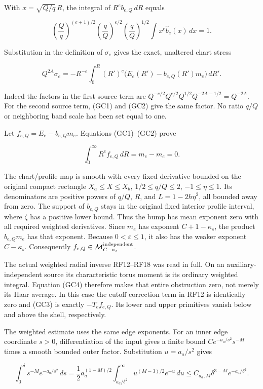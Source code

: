 \documentclass[10pt,a4paper]{article}
\begin{document}
With \(x=\sqrt{Q/q}\,R\), the integral of \(R^eb_{e,Q}\,dR\) equals

\[
\left(\frac Qq\right)^{(e+1)/2}
\left(\frac qQ\right)^{e/2}
\left(\frac qQ\right)^{1/2}
\int x^e\widehat b_e(x)\,dx=1.
\]

Substitution in the definition of \(\sigma_e\) gives the exact, unaltered chart stress

\[
\boxed{\quad Q^{2A}\sigma_e
=-R^{-e}\int_0^R(R')^e
\big(E_e(R')-b_{e,Q}(R')m_e\big)\,dR'.\quad}
\tag{GC3}
\]

Indeed the factors in the first source term are \(Q^{-e/2}Q^{e/2}Q^{1/2}Q^{-2A-1/2}=Q^{-2A}\). For the second source term, (GC1) and (GC2) give the same factor. No ratio \(q/Q\) or neighboring band scale has been set equal to one.

Let \(f_{e,Q}=E_e-b_{e,Q}m_e\). Equations (GC1)--(GC2) prove

\[
\int_0^\infty R^ef_{e,Q}\,dR=m_e-m_e=0.
\tag{GC4}
\]

The chart/profile map is smooth with every fixed derivative bounded on the original compact rectangle \(X_a\le X\le X_b\), \(1/2\le q/Q\le2\), \(-1\le\eta\le1\). Its denominators are positive powers of \(q/Q\), \(R\), and \(L=1-2h\eta^2\), all bounded away from zero. The support of \(b_{e,Q}\) stays in the original fixed interior profile interval, where \(\zeta\) has a positive lower bound. Thus the bump has mean exponent zero with all required weighted derivatives. Since \(m_e\) has exponent \(C+1-\kappa_s\), the product \(b_{e,Q}m_e\) has that exponent. Because \(0<\varepsilon\le1\), it also has the weaker exponent \(C-\kappa_s\). Consequently \(f_{e,Q}\in\mathcal M_{C-\kappa_s}^{\rm independent}\).

The actual weighted radial inverse RF12--RF18 was read in full. On an auxiliary-independent source its characteristic torus moment is its ordinary weighted integral. Equation (GC4) therefore makes that entire obstruction zero, not merely its Haar average. In this case the cutoff correction term in RF12 is identically zero and (GC3) is exactly \(-T_ef_{e,Q}\). Its lower and upper primitives vanish below and above the shell, respectively.

The weighted estimate uses the same edge exponents. For an inner edge coordinate \(s>0\), differentiation of the input gives a finite bound \(C e^{-a_a/s^2}s^{-M}\) times a smooth bounded outer factor. Substitution \(u=a_a/s^2\) gives

\[
\int_0^\delta s^{-M}e^{-a_a/s^2}\,ds
=\frac12a_a^{(1-M)/2}
\int_{a_a/\delta^2}^{\infty}u^{(M-3)/2}e^{-u}\,du
\le C_{a_a,M}\delta^{3-M}e^{-a_a/\delta^2}.
\]
\end{document}
